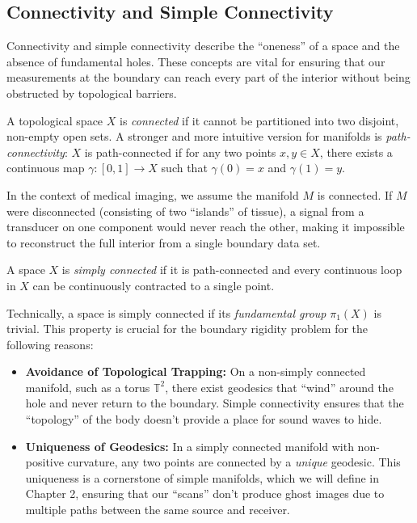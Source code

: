\subsection{Connectivity and Simple Connectivity} Connectivity and simple connectivity describe the ``oneness'' of a space and the absence of fundamental holes. These concepts are vital for ensuring that our measurements at the boundary can reach every part of the interior without being obstructed by topological barriers.

\begin{definition}
  A topological space $X$ is \emph{connected} if it cannot be partitioned into two disjoint, non-empty open sets. A stronger and more intuitive version for manifolds is \emph{path-connectivity}: $X$ is path-connected if for any two points $x, y \in X$, there exists a continuous map $\gamma: [0, 1] \to X$ such that $\gamma(0) = x$ and $\gamma(1) = y$.
\end{definition}

In the context of medical imaging, we assume the manifold $M$ is connected. If $M$ were disconnected (consisting of two ``islands'' of tissue), a signal from a transducer on one component would never reach the other, making it impossible to reconstruct the full interior from a single boundary data set.

\begin{definition}
  A space $X$ is \emph{simply connected} if it is path-connected and every continuous loop in $X$ can be continuously contracted to a single point.
\end{definition}

Technically, a space is simply connected if its \emph{fundamental group} $\pi_1(X)$ is trivial. This property is crucial for the boundary rigidity problem for the following reasons:

\begin{itemize}
  \item \textbf{Avoidance of Topological Trapping:} On a non-simply connected manifold, such as a torus $\mathbb{T}^2$, there exist geodesics that ``wind'' around the hole and never return to the boundary. Simple connectivity ensures that the ``topology'' of the body doesn't provide a place for sound waves to hide.
  \item \textbf{Uniqueness of Geodesics:} In a simply connected manifold with non-positive curvature, any two points are connected by a \emph{unique} geodesic. This uniqueness is a cornerstone of simple manifolds, which we will define in Chapter 2, ensuring that our ``scans'' don't produce ghost images due to multiple paths between the same source and receiver.
\end{itemize}

